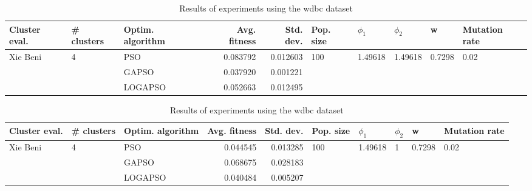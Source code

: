 \documentclass{article}
\begin{document}
\begin{table}
\centering
\caption{Results of experiments using the wdbc dataset}
\begin{tabular}{lllrrlllll}
\toprule
            Cluster eval. &        \# clusters & Optim. algorithm &  Avg. fitness &  Std. dev. &            Pop. size &               $\phi_{1}$ &               $\phi_{2}$ &                       w &         Mutation rate \\
\midrule
\multirow{3}{*}{Xie Beni} & \multirow{3}{*}{4} &              PSO &      0.083792 &   0.012603 & \multirow{3}{*}{100} & \multirow{3}{*}{1.49618} & \multirow{3}{*}{1.49618} & \multirow{3}{*}{0.7298} & \multirow{3}{*}{0.02} \\
                          &                    &            GAPSO &      0.037920 &   0.001221 &                      &                          &                          &                         &                       \\
                          &                    &          LOGAPSO &      0.052663 &   0.012495 &                      &                          &                          &                         &                       \\
\bottomrule
\end{tabular}
\end{table}
\begin{table}
\centering
\caption{Results of experiments using the wdbc dataset}
\begin{tabular}{lllrrlllll}
\toprule
            Cluster eval. &        \# clusters & Optim. algorithm &  Avg. fitness &  Std. dev. &            Pop. size &               $\phi_{1}$ &         $\phi_{2}$ &                       w &         Mutation rate \\
\midrule
\multirow{3}{*}{Xie Beni} & \multirow{3}{*}{4} &              PSO &      0.044545 &   0.013285 & \multirow{3}{*}{100} & \multirow{3}{*}{1.49618} & \multirow{3}{*}{1} & \multirow{3}{*}{0.7298} & \multirow{3}{*}{0.02} \\
                          &                    &            GAPSO &      0.068675 &   0.028183 &                      &                          &                    &                         &                       \\
                          &                    &          LOGAPSO &      0.040484 &   0.005207 &                      &                          &                    &                         &                       \\
\bottomrule
\end{tabular}
\end{table}
\end{document}
